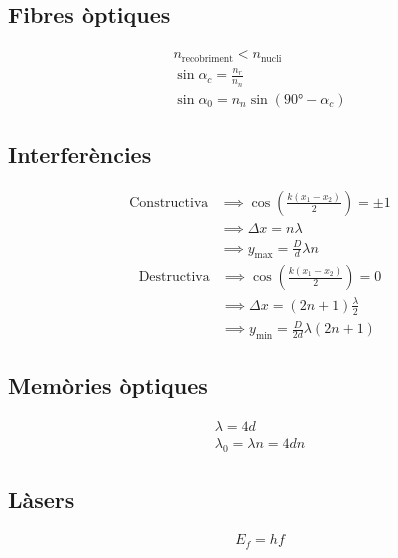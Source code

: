 \documentclass[10pt,twocolumn]{article}
\begin{document}
\subsection{Fibres òptiques}
\begin{gather*}
    n_\text{recobriment} < n_\text{nucli} \\
    \sin \alpha_c = \frac{n_r}{n_n} \\
    \sin \alpha_0 = n_n \sin\left(\ang{90}-\alpha_c\right)
\end{gather*}
\subsection{Interferències}
\begin{align*}
        \text{Constructiva} &\implies \cos\left(\frac{k\left(x_1-x_2\right)}{2}\right) = \pm 1 \\
                            &\implies \Delta x = n\lambda \\
                            &\implies y_\text{max} = \frac{D}{d}\lambda n
\end{align*}
\begin{align*}
        \text{Destructiva} &\implies \cos\left(\frac{k\left(x_1-x_2\right)}{2}\right) = 0 \\
                           &\implies \Delta x = \left(2n+1\right)\frac{\lambda}{2} \\
                           &\implies y_\text{min} = \frac{D}{2d}\lambda \left(2n+1\right)
\end{align*}
\subsection{Memòries òptiques}
\begin{gather*}
\lambda = 4d \\
\lambda_0 = \lambda n = 4dn
\end{gather*}
\subsection{Làsers}
\begin{gather*}
    E_f = h f
\end{gather*}
\end{document}
